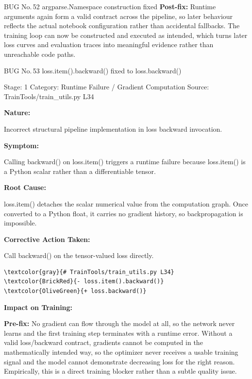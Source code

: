 \documentclass[10pt]{article}
\newcommand{\FieldLabel}[1]{%
 {\bfseries #1:}\par
}
\begin{document}
\begin{bugbox}{BUG No.\,52 \quad argparse.Namespace construction fixed}
\textbf{Post-fix:} Runtime arguments again form a valid contract across the pipeline, so later behaviour reflects the actual notebook configuration rather than accidental fallbacks. The training loop can now be constructed and executed as intended, which turns later loss curves and evaluation traces into meaningful evidence rather than unreachable code paths.
\par
\vspace{0.35em}
\end{bugbox}

\begin{bugbox}{BUG No.\,53 \quad loss.item().backward() fixed to loss.backward()}
{\color{MetaGray}\small Stage: 1 \;\textbar\; Category: Runtime Failure / Gradient Computation \;\textbar\; Source: TrainTools/train\_utils.py L34\par}
\vspace{0.22em}
\FieldLabel{Nature}
Incorrect structural pipeline implementation in loss backward invocation.
\par
\vspace{0.35em}
\FieldLabel{Symptom}
Calling backward() on loss.item() triggers a runtime failure because loss.item() is a Python scalar rather than a differentiable tensor.
\par
\vspace{0.35em}
\FieldLabel{Root Cause}
loss.item() detaches the scalar numerical value from the computation graph. Once converted to a Python float, it carries no gradient history, so backpropagation is impossible.
\par
\vspace{0.35em}
\FieldLabel{Corrective Action Taken}
Call backward() on the tensor-valued loss directly.
\par
\vspace{0.35em}
\begin{Verbatim}[commandchars=\\\{\},fontsize=\footnotesize,breaklines=true,breaksymbol={},frame=leftline,framerule=2pt,rulecolor=\color{gray!40},xleftmargin=6pt,formatcom=\singlespacing]
\textcolor{gray}{# TrainTools/train_utils.py L34}
\textcolor{BrickRed}{- loss.item().backward()}
\textcolor{OliveGreen}{+ loss.backward()}
\end{Verbatim}
\vspace{0.22em}
\FieldLabel{Impact on Training}
\textbf{Pre-fix:} No gradient can flow through the model at all, so the network never learns and the first training step terminates with a runtime error. Without a valid loss/backward contract, gradients cannot be computed in the mathematically intended way, so the optimizer never receives a usable training signal and the model cannot demonstrate decreasing loss for the right reason. Empirically, this is a direct training blocker rather than a subtle quality issue.\par\smallskip

\end{bugbox}
\end{document}
